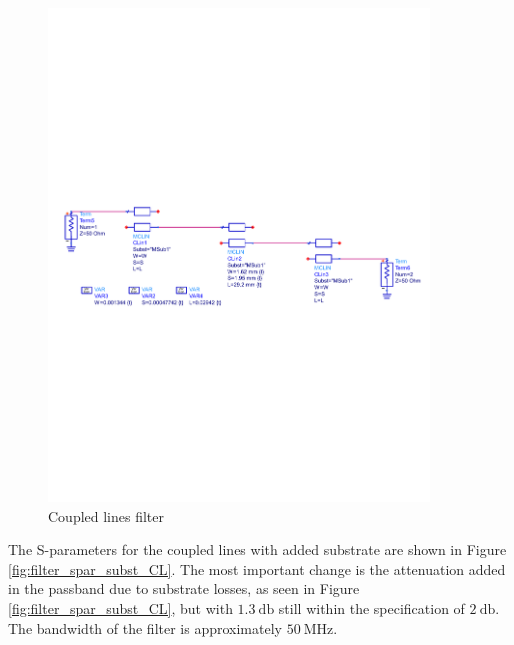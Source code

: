 \documentclass[a4paper]{article}        %
\begin{document}
  	\begin{figure}[H]
  		\centering
  		\includegraphics[width=0.9\textwidth]{fig/Filter/2nd_order/bandpass_subst_CL.pdf}
  		\caption{Coupled lines filter}
  		\label{fig:filter_final_CL}
  	\end{figure} 

  	The S-parameters for the coupled lines with added substrate are shown in Figure \ref{fig:filter_spar_subst_CL}. The most important change is the attenuation added in the passband due to substrate losses, as seen in Figure \ref{fig:filter_spar_subst_CL}, but with $\SI{1.3}{\decibel}$ still within the specification of $\SI{2}{\decibel}$. The bandwidth of the filter is approximately $\SI{50}{\mega\hertz}$.
\end{document}
